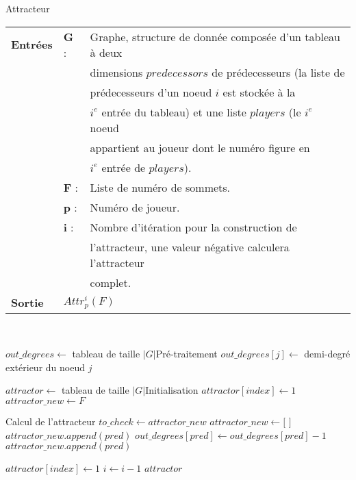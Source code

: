 \documentclass[12pt,a4paper,oneside, titlepage]{report}
\begin{document}
\begin{algorithm}
\caption{Attracteur}\label{attractor}
\hspace*{\algorithmicindent} 
\begin{tabular}{lll}
	\textbf{Entrées} & \textbf{G} : &Graphe, structure de donnée composée d'un tableau à deux\\
	&&dimensions $predecessors$ de prédecesseurs (la liste de \\
	&&prédecesseurs d'un noeud $i$ est stockée à la \\
	&&$i^e$ entrée du tableau) et une liste $players$ (le $i^e$ noeud\\
	&&appartient au joueur dont le numéro figure en \\
	&&$i^e$ entrée de $players$).\\
	&\textbf{F} : &Liste de numéro de sommets.\\
	&\textbf{p} : &Numéro de joueur.\\
	&\textbf{i} : &Nombre d'itération pour la construction de\\
	&&l'attracteur, une valeur négative calculera l'attracteur\\
	&&complet.\\
	\textbf{Sortie} &\multicolumn{2}{l}{$Attr_p^i(F)$}\\
\end{tabular}\\
\begin{algorithmic}[1]
	\State $out\_degrees \gets$ tableau de taille $|G|$\Comment Pré-traitement
			\State $out\_degrees[j] \gets $ demi-degré extérieur du noeud $j$
		\EndIf
	\EndFor
	
	\State $attractor \gets$ tableau de taille $|G|$\Comment Initialisation
		\State $attractor[index] \gets 1$
	\EndFor
	\State $attractor\_new \gets F$
	
	\Comment Calcul de l'attracteur
		\State $to\_check \gets attractor\_new$
		\State $attractor\_new \gets [$ $]$
						\State $attractor\_new.append(pred)$
					\Else
						\State $out\_degrees[pred]\gets out\_degrees[pred]-1$
							\State $attractor\_new.append(pred)$
						\EndIf
					\EndIf
				\EndIf
			\EndFor
		\EndFor
\end{algorithmic}
\end{algorithm}
\newpage
\begin{algorithm}
\begin{algorithmic}[1]
			\State $attractor[index]\gets 1$
		\EndFor
		\State $i\gets i-1$
	\EndWhile
	\State\Return $attractor$
\EndProcedure
\end{algorithmic}
\end{algorithm}
\end{document}
